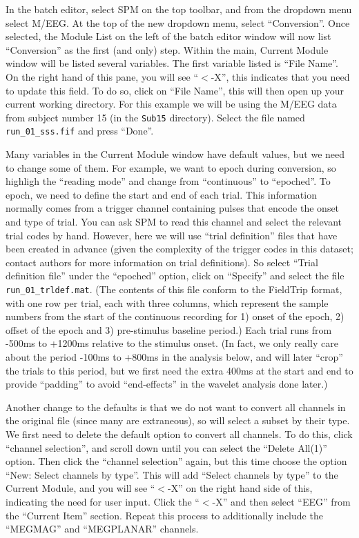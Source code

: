 In the batch editor, select SPM on the top toolbar, and from the dropdown menu select M/EEG. At the top of the new dropdown menu, select ``Conversion''. Once selected, the Module List on the left of the batch editor window will now list ``Conversion'' as the first (and only) step. Within the main, Current Module window will be listed several variables. The first variable listed is ``File Name''. On the right hand of this pane, you will see ``\(<\)-X'', this indicates that you need to update this field. To do so, click on ``File Name'', this will then open up your current working directory. For this example we will be using the M/EEG data from subject number 15 (in the \texttt{Sub15} directory). Select the file named \texttt{run\_01\_sss.fif} and press ``Done''.

Many variables in the Current Module window have default values, but we need to change some of them. For example, we want to epoch during conversion, so highligh the ``reading mode'' and change from ``continuous'' to ``epoched''. To epoch, we need to define the start and end of each trial. This information normally comes from a trigger channel containing pulses that encode the onset and type of trial. You can ask SPM to read this channel and select the relevant trial codes by hand. However, here we will use ``trial definition'' files that have been created in advance (given the complexity of the trigger codes in this dataset; contact authors for more information on trial definitions). So select ``Trial definition file'' under the ``epoched'' option, click on ``Specify'' and select the file \texttt{run\_01\_trldef.mat}. (The contents of this file conform to the FieldTrip format, with one row per trial, each with three columns, which represent the sample numbers from the start of the continuous recording for 1) onset of the epoch, 2) offset of the epoch and 3) pre-stimulus baseline period.) Each trial runs from -500ms to +1200ms relative to the stimulus onset. (In fact, we only really care about the period -100ms to +800ms in the analysis below, and will later ``crop'' the trials to this period, but we first need the extra 400ms at the start and end to provide ``padding'' to avoid ``end-effects'' in the wavelet analysis done later.)

Another change to the defaults is that we do not want to convert all channels in the original file (since many are extraneous), so will select a subset by their type. We first need to delete the default option to convert all channels. To do this, click ``channel selection'', and  scroll down until you can select the ``Delete All(1)'' option. Then click the ``channel selection'' again, but this time choose the option ``New: Select channels by type''. This will add ``Select channels by type'' to the Current Module, and you will see ``\(<\)-X'' on the right hand side of this, indicating the need for user input. Click the ``\(<\)-X'' and then select ``EEG'' from the ``Current Item'' section. Repeat this process to additionally include the ``MEGMAG'' and ``MEGPLANAR'' channels.

